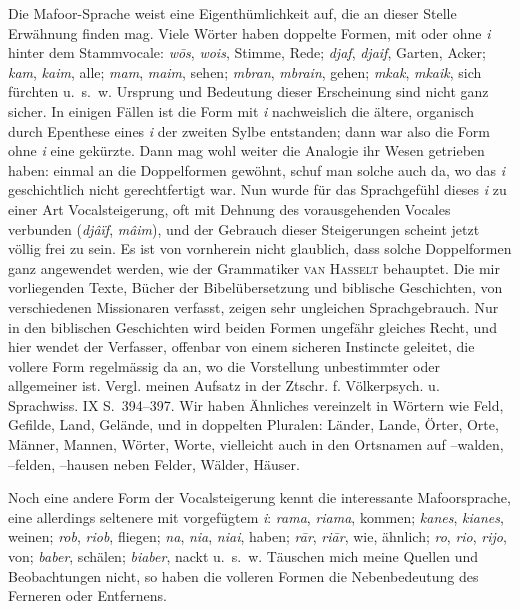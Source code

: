 Die Mafoor-Sprache weist  eine Eigenthümlichkeit auf, die an dieser Stelle Erwähnung finden mag. Viele Wörter haben doppelte Formen, mit oder ohne \textit{i} hinter dem Stammvocale: \textit{wōs}, \textit{wois}, Stimme, Rede; \textit{djaf}, \textit{djaif}, Garten, Acker; \textit{kam}, \textit{kaim}, alle; \textit{mam}, \textit{maim}, sehen; \textit{mbran}, \textit{mbrain}, gehen; \textit{mkak}, \textit{mkaik}, sich fürchten u.~s.~w. Ursprung und Bedeutung dieser Erscheinung sind nicht ganz sicher. In einigen Fällen ist die Form mit \textit{i} nachweislich die ältere, organisch durch Epenthese eines \textit{i} der zweiten Sylbe entstanden; dann war also die Form ohne \textit{i} eine gekürzte. Dann mag wohl weiter die Analogie ihr Wesen getrieben haben: einmal an die Doppelformen gewöhnt, schuf man solche auch da, wo das \textit{i} geschichtlich nicht gerechtfertigt war. Nun wurde für das Sprachgefühl dieses \textit{i} zu einer Art Vocalsteigerung, oft mit Dehnung des vorausgehenden Vocales verbunden (\textit{djâïf}, \textit{mâim}), und der Gebrauch dieser Steigerungen scheint jetzt völlig frei zu sein. Es ist von vornherein nicht glaublich, dass solche \label{sp.444} Doppelformen ganz  angewendet werden, wie der Grammatiker \textsc{van Hasselt} behauptet. Die mir vorliegenden Texte, Bücher der Bibelübersetzung und biblische Geschichten, von verschiedenen Missionaren verfasst, zeigen sehr ungleichen Sprachgebrauch. Nur in den biblischen Geschichten wird \label{fp.423} beiden Formen ungefähr gleiches Recht, und hier wendet der Verfasser, offenbar von einem sicheren Instincte geleitet, die vollere Form regelmässig da an, wo die Vorstellung unbestimmter oder allgemeiner ist. Vergl. meinen Aufsatz in der Ztschr. f. Völkerpsych. u. Sprachwiss. IX S.~394–397. Wir haben Ähnliches vereinzelt in Wörtern wie Feld, Gefilde, Land, Gelände, und in doppelten Pluralen: Länder, Lande, Örter, Orte, Männer, Mannen, Wörter, Worte, vielleicht auch in den Ortsnamen auf –walden, –felden, –hausen neben Felder, Wälder, Häuser.

\largerpage[-1]
Noch eine andere Form der Vocalsteigerung kennt die interessante Mafoorsprache, eine allerdings seltenere mit vorgefügtem \textit{i}: \textit{rama}, \textit{riama}, kommen; \textit{kanes}, \textit{kianes}, weinen; \textit{rob}, \textit{riob}, fliegen; \textit{na}, \textit{nia}, \textit{niai}, haben; \textit{rār}, \textit{riār}, wie, ähnlich; \textit{ro}, \textit{rio}, \textit{rijo}, von; \textit{baber}, schälen; \textit{biaber}, nackt u.~s.~w. Täuschen mich meine Quellen und Beobachtungen nicht, so haben die volleren Formen die Nebenbedeutung des Ferneren oder Entfernens.

